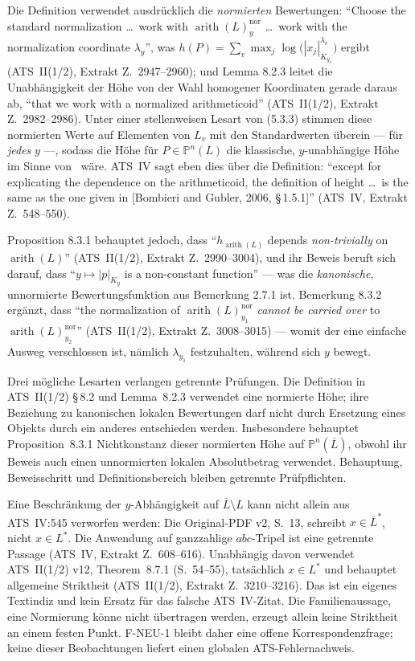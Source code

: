 \documentclass[11pt,a4paper]{article}
\theoremstyle{definition}
\theoremstyle{plain}
\theoremstyle{definition}
\newcommand{\arith}{\operatorname{arith}}
\newcommand{\anchor}[2]{(#1, Extrakt Z.~#2)}
\begin{document}
Die Definition verwendet ausdrücklich die \emph{normierten} Bewertungen: ``Choose the
standard normalization \ldots\ work with $\arith(L)^{\mathrm{nor}}_y$ \ldots\ work
with the normalization coordinate $\lambda_y$'', was
$h(P) = \sum_v \max_j \log\bigl(|x_j|^{\lambda_v}_{K_{y_v}}\bigr)$ ergibt
\anchor{ATS~II(1/2)}{2947--2960}; und Lemma 8.2.3 leitet die Unabhängigkeit der Höhe
von der Wahl homogener Koordinaten gerade daraus ab, ``that we work with a
normalized arithmeticoid'' \anchor{ATS~II(1/2)}{2982--2986}. Unter einer
stellenweisen Lesart von (5.3.3) stimmen diese normierten Werte auf Elementen von
$L_v$ mit den Standardwerten überein --- für \emph{jedes} $y$ ---, sodass die Höhe
für $P \in \mathbb{P}^n(L)$ die klassische, $y$-unabhängige Höhe im
Sinne von~\cite{BombieriGubler2006} wäre. ATS~IV sagt eben dies über die
Definition: ``except for explicating the dependence on the arithmeticoid, the
definition of height \ldots\ is the same as the one given in [Bombieri and Gubler,
2006, \S\,1.5.1]'' \anchor{ATS~IV}{548--550}.

Proposition 8.3.1 behauptet jedoch, dass
``$h_{\arith(L)}$ depends \emph{non-trivially} on
$\arith(L)$'' \anchor{ATS~II(1/2)}{2990--3004}, und ihr Beweis beruft sich darauf,
dass ``$y \mapsto |p|_{K_y}$ is a non-constant function'' --- was die
\emph{kanonische}, unnormierte Bewertungsfunktion aus Bemerkung 2.7.1 ist. Bemerkung
8.3.2 ergänzt, dass ``the
normalization of $\arith(L)^{\mathrm{nor}}_{y_1}$ \emph{cannot be carried over} to
$\arith(L)^{\mathrm{nor}}_{y_2}$'' \anchor{ATS~II(1/2)}{3008--3015} --- womit der
eine einfache Ausweg verschlossen ist, nämlich $\lambda_{y_1}$ festzuhalten, während
sich $y$ bewegt.

Drei mögliche Lesarten verlangen getrennte Prüfungen. Die Definition
in ATS~II(1/2) \S\,8.2 und Lemma~8.2.3 verwendet eine normierte
Höhe; ihre Beziehung zu kanonischen lokalen Bewertungen darf nicht durch
Ersetzung eines Objekts durch ein anderes entschieden werden.
Insbesondere behauptet Proposition~8.3.1 Nichtkonstanz dieser normierten
Höhe auf $\mathbb P^n(\overline L)$, obwohl ihr Beweis auch einen
unnormierten lokalen Absolutbetrag verwendet. Behauptung, Beweisschritt und
Definitionsbereich bleiben getrennte Prüfpflichten.

Eine Beschränkung der $y$-Abhängigkeit auf $\overline L\setminus L$
kann nicht allein aus ATS~IV:545 verworfen werden: Die Original-PDF v2,
S.~13, schreibt $x\in\overline L^*$, nicht $x\in L^*$.
Die Anwendung auf ganzzahlige $abc$-Tripel ist eine getrennte Passage
\anchor{ATS~IV}{608--616}. Unabhängig davon verwendet ATS~II(1/2)
v12, Theorem~8.7.1 (S.~54--55), tatsächlich $x\in L^*$ und
behauptet allgemeine Striktheit \anchor{ATS~II(1/2)}{3210--3216}.
Das ist ein eigenes Textindiz und kein Ersatz für das falsche ATS~IV-Zitat.
Die Familienaussage, eine Normierung könne nicht übertragen werden,
erzeugt allein keine Striktheit an einem festen Punkt. F-NEU-1 bleibt
daher eine offene Korrespondenzfrage; keine dieser Beobachtungen liefert
einen globalen ATS-Fehlernachweis.
\end{document}

